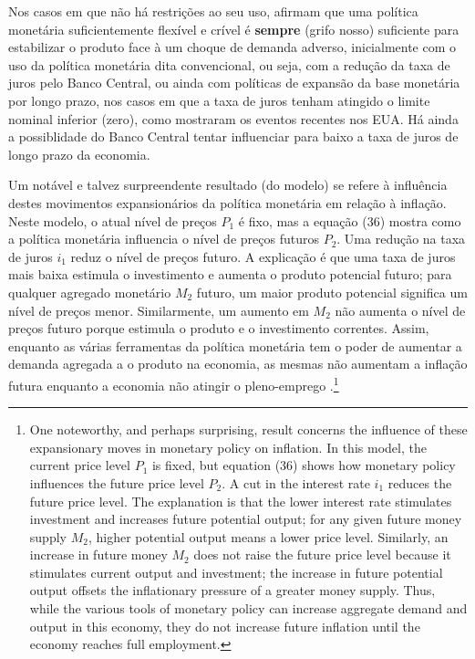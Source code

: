 \documentclass[
	10pt,				%
	openright,			%
	twoside,			%
	a5paper,			%
	english,			%
	french,				%
	spanish,			%
	brazil				%
	]{abntex2}
\renewenvironment{quote}
  {\small\list{}{\rightmargin=0.1cm \leftmargin=4cm}%
   \item\relax}
  {\endlist}
\begin{document}
Nos casos em que não há restrições ao seu uso,
 afirmam que uma política monetária
suficientemente flexível e crível é \textbf{sempre} (grifo nosso)
suficiente para estabilizar o produto face à um choque de demanda
adverso, inicialmente com o uso da política monetária dita convencional,
ou seja, com a redução da taxa de juros pelo Banco Central, ou ainda com
políticas de expansão da base monetária por longo prazo, nos casos em
que a taxa de juros tenham atingido o limite nominal inferior (zero),
como mostraram os eventos recentes nos EUA. Há ainda a possiblidade do
Banco Central tentar influenciar para baixo a taxa de juros de longo
prazo da economia.

\begin{quote}
Um notável e talvez surpreendente resultado (do modelo) se refere à
influência destes movimentos expansionários da política monetária em
relação à inflação. Neste modelo, o atual nível de preços \(P_1\) é
fixo, mas a equação (36) mostra como a política monetária influencia o
nível de preços futuros \(P_2\). Uma redução na taxa de juros \(i_1\)
reduz o nível de preços futuro. A explicação é que uma taxa de juros
mais baixa estimula o investimento e aumenta o produto potencial futuro;
para qualquer agregado monetário \(M_2\) futuro, um maior produto
potencial significa um nível de preços menor. Similarmente, um aumento
em \(M_2\) não aumenta o nível de preços futuro porque estimula o
produto e o investimento correntes. Assim, enquanto as várias
ferramentas da política monetária tem o poder de aumentar a demanda
agregada a o produto na economia, as mesmas não aumentam a inflação
futura enquanto a economia não atingir o pleno-emprego
\cite[p.~19]{mankiw2011}.\footnote{One noteworthy, and perhaps
  surprising, result concerns the influence of these expansionary moves
  in monetary policy on inflation. In this model, the current price
  level \(P_1\) is fixed, but equation (36) shows how monetary policy
  influences the future price level \(P_2\). A cut in the interest rate
  \(i_1\) reduces the future price level. The explanation is that the
  lower interest rate stimulates investment and increases future
  potential output; for any given future money supply \(M_2\), higher
  potential output means a lower price level. Similarly, an increase in
  future money \(M_2\) does not raise the future price level because it
  stimulates current output and investment; the increase in future
  potential output offsets the inflationary pressure of a greater money
  supply. Thus, while the various tools of monetary policy can increase
  aggregate demand and output in this economy, they do not increase
  future inflation until the economy reaches full employment.}
\end{quote}
\end{document}
